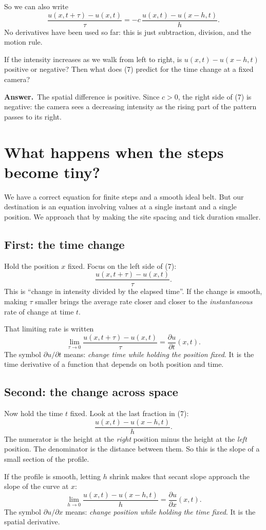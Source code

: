 \documentclass[11pt,a4paper]{article}
\newcommand{\secstart}[1]{\Needspace{7\baselineskip}\section{#1}}
\newcommand{\substart}[1]{\Needspace{5\baselineskip}\subsection{#1}}
\newcommand{\answer}{\par\smallskip\textbf{Answer.}~}
\begin{document}
So we can also write
\begin{equation}
\frac{u(x,t+\tau)-u(x,t)}{\tau}
=-c\,\frac{u(x,t)-u(x-h,t)}{h}.
\tag{7}
\end{equation}
No derivatives have been used so far: this is just subtraction, division, and the motion rule.

\begin{thinkbox}
If the intensity increases as we walk from left to right, is $u(x,t)-u(x-h,t)$ positive or negative? Then what does (7) predict for the time change at a fixed camera?
\answer The spatial difference is positive. Since $c>0$, the right side of (7) is negative: the camera sees a decreasing intensity as the rising part of the pattern passes to its right.
\end{thinkbox}

\clearpage
\secstart{What happens when the steps become tiny?}
We have a correct equation for finite steps and a smooth ideal belt. But our destination is an equation involving values at a single instant and a single position. We approach that by making the site spacing and tick duration smaller.

\substart{First: the time change}
Hold the position $x$ fixed. Focus on the left side of (7):
\[
\frac{u(x,t+\tau)-u(x,t)}{\tau}.
\]
This is ``change in intensity divided by the elapsed time''. If the change is smooth, making $\tau$ smaller brings the average rate closer and closer to the \emph{instantaneous} rate of change at time $t$.

That limiting rate is written
\begin{equation*}
\lim_{\tau\to0}\frac{u(x,t+\tau)-u(x,t)}{\tau}
=\frac{\partial u}{\partial t}(x,t).
\end{equation*}
The symbol $\partial u/\partial t$ means: \emph{change time while holding the position fixed}. It is the time derivative of a function that depends on both position and time.

\substart{Second: the change across space}
Now hold the time $t$ fixed. Look at the last fraction in (7):
\[
\frac{u(x,t)-u(x-h,t)}{h}.
\]
The numerator is the height at the \emph{right} position minus the height at the \emph{left} position. The denominator is the distance between them. So this is the slope of a small section of the profile.

If the profile is smooth, letting $h$ shrink makes that secant slope approach the slope of the curve at $x$:
\begin{equation*}
\lim_{h\to0}\frac{u(x,t)-u(x-h,t)}{h}
=\frac{\partial u}{\partial x}(x,t).
\end{equation*}
The symbol $\partial u/\partial x$ means: \emph{change position while holding the time fixed}. It is the spatial derivative.
\end{document}
